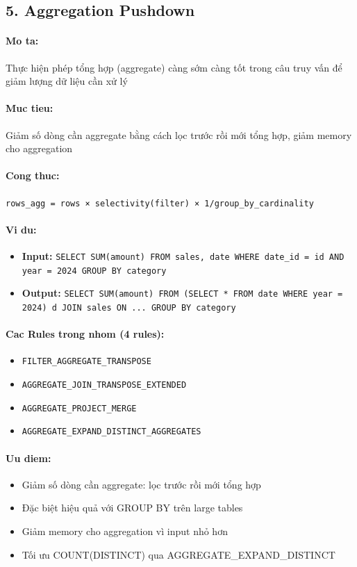 \subsection*{\bfseries 5. Aggregation Pushdown}
\paragraph{Mo ta:} Thực hiện phép tổng hợp (aggregate) càng sớm càng tốt trong câu truy vấn để giảm lượng dữ liệu cần xử lý
\paragraph{Muc tieu:} Giảm số dòng cần aggregate bằng cách lọc trước rồi mới tổng hợp, giảm memory cho aggregation
\paragraph{Cong thuc:} \texttt{rows_agg = rows × selectivity(filter) × 1/group_by_cardinality}
\paragraph{Vi du:}
\begin{itemize}
\item \textbf{Input:} \texttt{SELECT SUM(amount) FROM sales, date WHERE date_id = id AND year = 2024 GROUP BY category}
\item \textbf{Output:} \texttt{SELECT SUM(amount) FROM (SELECT * FROM date WHERE year = 2024) d JOIN sales ON ... GROUP BY category}
\end{itemize}
\paragraph{Cac Rules trong nhom (4 rules):}
\begin{itemize}
\item \texttt{FILTER_AGGREGATE_TRANSPOSE}
\item \texttt{AGGREGATE_JOIN_TRANSPOSE_EXTENDED}
\item \texttt{AGGREGATE_PROJECT_MERGE}
\item \texttt{AGGREGATE_EXPAND_DISTINCT_AGGREGATES}
\end{itemize}
\paragraph{Uu diem:}
\begin{itemize}
\item Giảm số dòng cần aggregate: lọc trước rồi mới tổng hợp
\item Đặc biệt hiệu quả với GROUP BY trên large tables
\item Giảm memory cho aggregation vì input nhỏ hơn
\item Tối ưu COUNT(DISTINCT) qua AGGREGATE_EXPAND_DISTINCT
\end{itemize}
